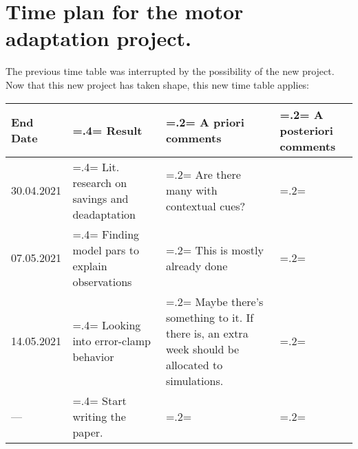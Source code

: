\documentclass{report}
\begin{document}
\section*{Time plan for the motor adaptation project.}

The previous time table was interrupted by the possibility of the new project. Now that this new project has taken shape, this new time table applies:

\noindent
\begin{tabularx}{\textwidth}{
  l|
  >{\hsize=.4\hsize\linewidth=\hsize}X|
  >{\hsize=.2\hsize\linewidth=\hsize}X|
  >{\hsize=.2\hsize\linewidth=\hsize}X}
End Date & Result & A priori comments & A posteriori comments \\ \hline \hline
30.04.2021 & Lit. research on savings and deadaptation & Are there many with contextual cues? & \\ \hline
07.05.2021 & Finding model pars to explain observations & This is mostly already done &  \\\hline
14.05.2021 & Looking into error-clamp behavior & Maybe there's something to it. If there is, an extra week should be allocated to simulations. &  \\\hline
--- & Start writing the paper. & & \\ \hline
\end{tabularx}
\end{document}
